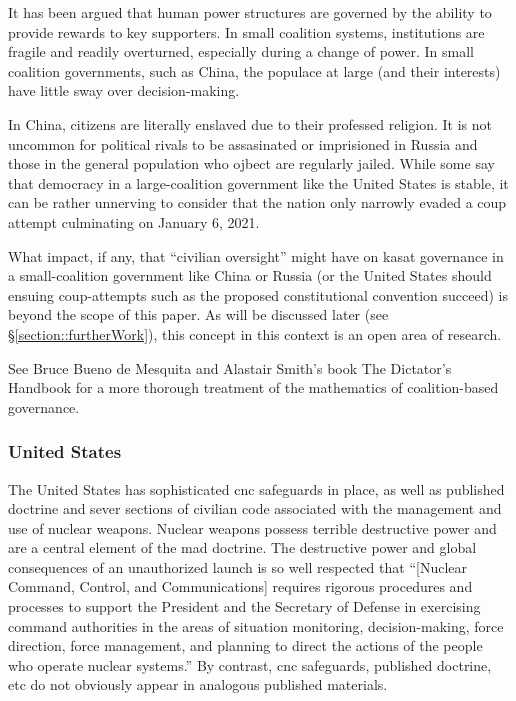 It has been argued that human power structures are governed by the
ability to provide rewards to key supporters.\cite[ch1]{dictator} In
small coalition systems, institutions are fragile and readily
overturned, especially during a change of power.\cite[ch2]{dictator}
In small coalition governments, such as China, the populace at large
(and their interests) have little sway over
decision-making.\cite[ch1]{dictator}

In China, citizens are literally enslaved due to their professed
religion.\cite[ouigers]{xxx} It is not uncommon for political rivals
to be assasinated\cite[polonium]{xxx} or
imprisioned\cite[navalny]{xxx} in Russia and those in the general
population who ojbect are regularly jailed.\cite[protestors
  jailed]{xxx} While some say that democracy in a large-coalition
government like the United States is stable, it can be rather
unnerving to consider that the nation only narrowly evaded a coup
attempt culminating on January 6, 2021.\cite[summary of coup
  attempt]{xxx}

What impact, if any, that ``civilian oversight'' might have on
\ac{kasat} governance in a small-coalition government like China or
Russia (or the United States should ensuing coup-attempts such as the
proposed constitutional convention succeed) is beyond the scope of
this paper.  As will be discussed later (see
\S\ref{section::furtherWork}), this concept in this context is an open
area of research.

See Bruce Bueno de Mesquita and Alastair Smith's book
\cite{https://www.publicaffairsbooks.com/titles/bruce-bueno-de-mesquita/the-dictators-handbook/9781541701366/}{The
  Dictator's Handbook} for a more thorough treatment of the
mathematics of coalition-based governance.


\subsubsection{United States}

The United States has sophisticated \ac{cnc} safeguards in place, as
well as published doctrine and sever sections of civilian code
associated with the management and use of nuclear weapons.\cite[the
  right joint publication]{xxx} Nuclear weapons possess terrible
destructive power and are a central element of the \acf{mad}
doctrine.\cite[mad overview]{xxx} The destructive power and global
consequences of an unauthorized launch is so well respected that
``[Nuclear Command, Control, and Communications] requires rigorous
procedures and processes to support the President and the Secretary of
Defense in exercising command authorities in the areas of situation
monitoring, decision-making, force direction, force management, and
planning to direct the actions of the people who operate nuclear
systems.''\cite{nuke-matters-handbook} By contrast, \ac{cnc}
safeguards, published doctrine, etc do not obviously appear in
analogous published materials.

